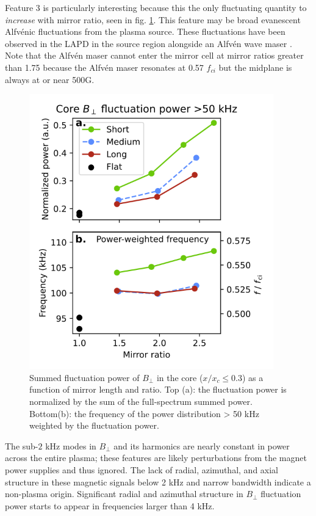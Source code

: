 Feature 3 is particularly interesting because
this the only fluctuating quantity to \textit{increase} with mirror ratio, seen in fig. \ref{fig:Bperp_core_highfreq}. This feature may be broad evanescent Alfv\'enic fluctuations from the plasma source.
These fluctuations have been observed in the LAPD in the source region alongside an Alfvén wave maser \cite{Maggs_2005}. Note that the Alfv\'en maser cannot enter the mirror cell at mirror ratios greater than 1.75 because the Alfv\'en maser resonates at 0.57 $f_{ci}$ but the midplane is always at or near 500G. 

\begin{figure}
    \centering
    \includegraphics[width=300pt]{figures/fig15.pdf}
    \caption{Summed fluctuation power of $B_\perp$ in the core ($x/x_c \leq 0.3$) as a function of mirror length and ratio. Top (a): the fluctuation power is normalized by the sum of the full-spectrum summed power. Bottom(b): the frequency of the power distribution > 50 kHz weighted by the fluctuation power.}
    \label{fig:Bperp_core_highfreq}
\end{figure}

The sub-$2$ kHz modes in $B_\perp$ and its harmonics are nearly constant in power across the entire plasma; these features are likely perturbations from the magnet power supplies and thus ignored. The lack of radial, azimuthal, and axial structure in these magnetic signals below 2 kHz and narrow bandwidth indicate a non-plasma origin. Significant radial and azimuthal structure in $B_\perp$ fluctuation power starts to appear in frequencies larger than 4 kHz.

